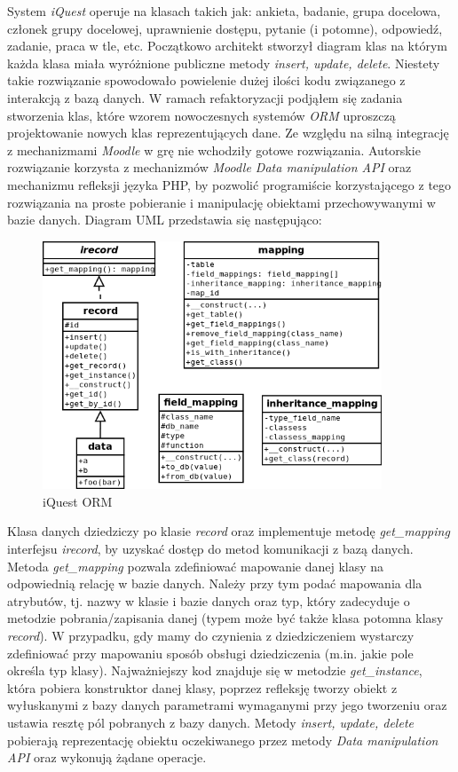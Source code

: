 System \emph{iQuest} operuje na klasach takich jak: ankieta, badanie, grupa docelowa, członek grupy docelowej, uprawnienie dostępu, pytanie (i potomne), odpowiedź, zadanie, praca w tle, etc. Początkowo architekt stworzył diagram klas na którym każda klasa miała wyróżnione publiczne metody \emph{insert, update, delete}. Niestety takie rozwiązanie spowodowało powielenie dużej ilości kodu związanego z interakcją z bazą danych. W ramach refaktoryzacji podjąłem się zadania stworzenia klas, które wzorem nowoczesnych systemów \emph{ORM} uproszczą projektowanie nowych klas reprezentujących dane. Ze względu na silną integrację z mechanizmami \emph{Moodle} w grę nie wchodziły gotowe rozwiązania. Autorskie rozwiązanie korzysta z mechanizmów \emph{Moodle Data manipulation API} oraz mechanizmu refleksji języka PHP, by pozwolić programiście korzystającego z tego rozwiązania na proste pobieranie i manipulację obiektami przechowywanymi w bazie danych. Diagram UML przedstawia się następująco:
\begin{figure}[H]
\begin{center}
\includegraphics[width=0.9\textwidth]{figures/lw/iquest-orm.png} 
\end{center}
\caption{iQuest ORM}
\label{fig:iquest-orm}
\end{figure}
Klasa danych dziedziczy po klasie \emph{record} oraz implementuje metodę \emph{get\_mapping} interfejsu \emph{irecord}, by uzyskać dostęp do metod komunikacji z bazą danych. Metoda \emph{get\_mapping} pozwala zdefiniować mapowanie danej klasy na odpowiednią relację w bazie danych. Należy przy tym podać mapowania dla atrybutów, tj. nazwy w klasie i bazie danych oraz typ, który zadecyduje o metodzie pobrania/zapisania danej (typem może być także klasa potomna klasy \emph{record}). W przypadku, gdy mamy do czynienia z dziedziczeniem wystarczy zdefiniować przy mapowaniu sposób obsługi dziedziczenia (m.in. jakie pole określa typ klasy). Najważniejszy kod znajduje się w metodzie \emph{get\_instance}, która pobiera konstruktor danej klasy, poprzez refleksję tworzy obiekt z wyłuskanymi z bazy danych parametrami wymaganymi przy jego tworzeniu oraz ustawia resztę pól pobranych z bazy danych. Metody \emph{insert, update, delete} pobierają reprezentację obiektu oczekiwanego przez metody \emph{Data manipulation API} oraz wykonują żądane operacje.\\
